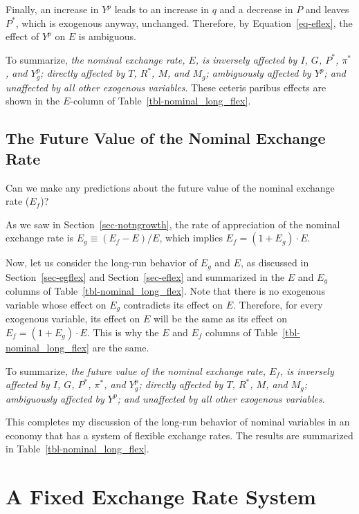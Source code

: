 \documentclass[
  letterpaper,
]{book}
\theoremstyle{plain}
\theoremstyle{remark}
\begin{document}
Finally, an increase in \(Y^p\) leads to an increase in \(q\) and a
decrease in \(P\) and leaves \(P^*\), which is exogenous anyway,
unchanged. Therefore, by Equation~\ref{eq-eflex}, the effect of \(Y^p\)
on \(E\) is ambiguous.

To summarize, \emph{the nominal exchange rate, \(E\), is inversely
affected by \(I\), \(G\), \(P^*\), \(\pi^*\), and \(Y^p_g\); directly
affected by \(T\), \(R^*\), \(M\), and \(M_g\); ambiguously affected by
\(Y^p\); and unaffected by all other exogenous variables}. These ceteris
paribus effects are shown in the \(E\)-column of
Table~\ref{tbl-nominal_long_flex}.

\subsection{The Future Value of the Nominal Exchange
Rate}\label{sec-efflex}

Can we make any predictions about the future value of the nominal
exchange rate (\(E_f\))?

As we saw in Section~\ref{sec-notngrowth}, the rate of appreciation of
the nominal exchange rate is \(E_g\equiv (E_f-E)/E\), which implies
\(E_f=(1+E_g)\cdot E\).

Now, let us consider the long-run behavior of \(E_g\) and \(E\), as
discussed in Section~\ref{sec-egflex} and Section~\ref{sec-eflex} and
summarized in the \(E\) and \(E_g\) columns of
Table~\ref{tbl-nominal_long_flex}. Note that there is no exogenous
variable whose effect on \(E_g\) contradicts its effect on \(E\).
Therefore, for every exogenous variable, its effect on \(E\) will be the
same as its effect on \(E_f=(1+E_g)\cdot E\). This is why the \(E\) and
\(E_f\) columns of Table~\ref{tbl-nominal_long_flex} are the same.

To summarize, \emph{the future value of the nominal exchange rate,
\(E_f\), is inversely affected by \(I\), \(G\), \(P^*\), \(\pi^*\), and
\(Y^p_g\); directly affected by \(T\), \(R^*\), \(M\), and \(M_g\);
ambiguously affected by \(Y^p\); and unaffected by all other exogenous
variables}.

This completes my discussion of the long-run behavior of nominal
variables in an economy that has a system of flexible exchange rates.
The results are summarized in Table~\ref{tbl-nominal_long_flex}.

\section{A Fixed Exchange Rate System}\label{sec-fix}
\end{document}
